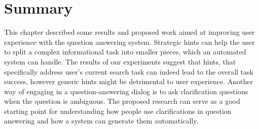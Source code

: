 \section{Summary}

This chapter described some results and proposed work aimed at improving user experience with the question answering system.
Strategic hints can help the user to split a complex informational task into smaller pieces, which an automated system can handle.
The results of our experiments suggest that hints, that specifically address user's current search task can indeed lead to the overall task success, however generic hints might be detrimental to user experience.
Another way of engaging in a question-answering dialog is to ask clarification questions when the question is ambiguous.
The proposed research can serve as a good starting point for understanding how people use clarifications in question answering and how a system can generate them automatically.